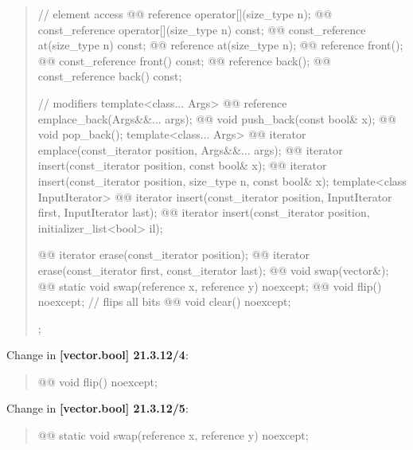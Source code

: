 \documentclass{wg21}
\begin{document}
\begin{quote}
\begin{codeblock}
{{    // element access
    @@ reference       operator[](size_type n);
    @@ const_reference operator[](size_type n) const;
    @@ const_reference at(size_type n) const;
    @@ reference       at(size_type n);
    @@ reference       front();
    @@ const_reference front() const;
    @@ reference       back();
    @@ const_reference back() const;

    // modifiers
    template<class... Args> @@ reference emplace_back(Args&&... args);
    @@ void push_back(const bool& x);
    @@ void pop_back();
    template<class... Args> @@ iterator emplace(const_iterator position, Args&&... args);
    @@ iterator insert(const_iterator position, const bool& x);
    @@ iterator insert(const_iterator position, size_type n, const bool& x);
    template<class InputIterator>
      @@ iterator insert(const_iterator position, InputIterator first, InputIterator last);
    @@ iterator insert(const_iterator position, initializer_list<bool> il);

    @@ iterator erase(const_iterator position);
    @@ iterator erase(const_iterator first, const_iterator last);
    @@ void swap(vector&);
    @@ static void swap(reference x, reference y) noexcept;
    @@ void flip() noexcept;       // flips all bits
    @@ void clear() noexcept;
  };
}
\end{codeblock}%
\end{quote}

Change in \textbf{[vector.bool] 21.3.12/4}:
\begin{quote}
\begin{itemdecl}
@@ void flip() noexcept;
\end{itemdecl}
\end{quote}

Change in \textbf{[vector.bool] 21.3.12/5}:
\begin{quote}
\begin{itemdecl}
@@ static void swap(reference x, reference y) noexcept;
\end{itemdecl}
\end{quote}
\end{document}
